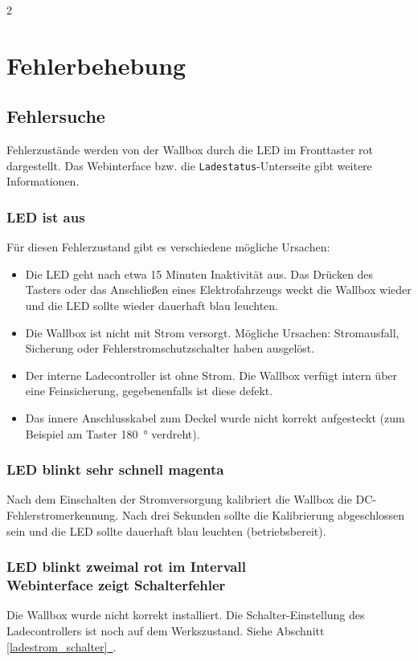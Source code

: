 \documentclass[a4paper,10pt]{article}
\newcommand*{\fullref}[1]{Abschnitt \hyperref[{#1}]{\ref*{#1}~\nameref*{#1}}}
\begin{document}
\begin{multicols*}{2}
	\newpage
    \section{Fehlerbehebung}\label{fehlerbehebung}
    \subsection{Fehlersuche}
    Fehlerzustände werden von der Wallbox durch die LED im Fronttaster rot
    dargestellt. Das Webinterface bzw. die \texttt{Ladestatus}-Unterseite
    gibt weitere Informationen.

    \subsubsection*{LED ist aus}
    Für diesen Fehlerzustand gibt es verschiedene mögliche Ursachen:
    \begin{itemize}
        \item Die LED geht nach etwa 15 Minuten Inaktivität aus. Das Drücken des Tasters
              oder das Anschließen eines Elektrofahrzeugs weckt die Wallbox wieder
              und die LED sollte wieder dauerhaft blau leuchten.
        \item Die Wallbox ist nicht mit Strom versorgt. Mögliche Ursachen: Stromausfall,
              Sicherung oder Fehlerstrom\-schutzschalter haben ausgelöst.
        \item Der interne Ladecontroller ist ohne Strom. Die Wallbox verfügt
		intern über eine Feinsicherung, gegebenenfalls ist diese defekt.
        \item Das innere Anschlusskabel zum Deckel wurde nicht korrekt aufgesteckt (zum Beispiel am Taster \SI{180}{\degree} verdreht).
    \end{itemize}

    \subsubsection*{LED blinkt sehr schnell magenta}\label{fast_blink}
    Nach dem Einschalten der Stromversorgung kalibriert die Wallbox die
    DC-Fehlerstromerkennung. Nach drei Sekunden sollte die Kalibrierung
    abgeschlossen sein und die LED sollte dauerhaft blau leuchten
    (betriebsbereit).

    \subsubsection*{LED blinkt zweimal rot im Intervall \\ Webinterface zeigt Schalterfehler}
    Die Wallbox wurde nicht korrekt installiert. Die Schalter-Einstellung des Ladecontrollers ist
    noch auf dem Werkszustand. Siehe \fullref{ladestrom_schalter}.


\end{multicols*}
\end{document}
